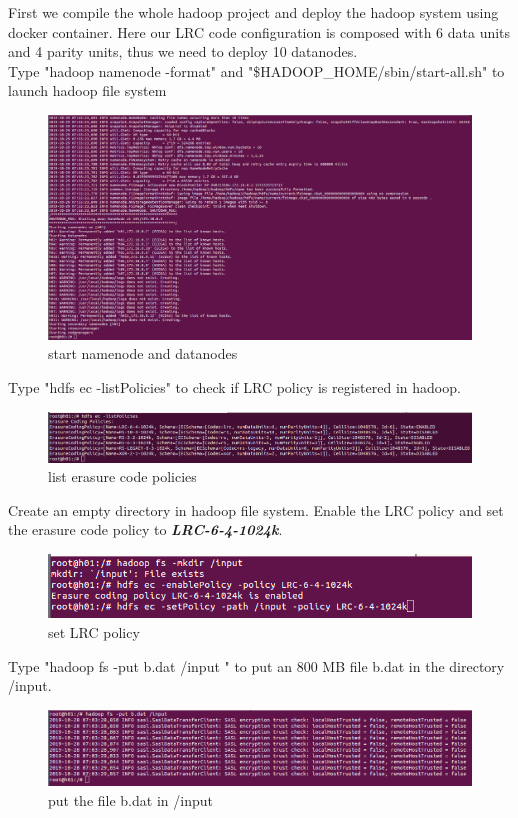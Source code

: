 \documentclass[10pt]{article}
\begin{document}
First we compile the whole hadoop project and deploy the hadoop system using docker container.
Here our LRC code configuration is composed with 6 data units and 4 parity units, thus we need to deploy 10 datanodes.\\

Type "hadoop namenode -format" and "\$HADOOP\_HOME/sbin/start-all.sh" to launch hadoop file system
\begin{figure}[H]
  \centering
  \includegraphics[width=\linewidth]{test-0.png}
  \caption{start namenode and datanodes}
\end{figure}

Type "hdfs ec -listPolicies" to check if LRC policy is registered in hadoop.
\begin{figure}[H]
  \centering
  \includegraphics[width=\linewidth]{test-1.png}
  \caption{list erasure code policies}
\end{figure}

Create an empty directory in hadoop file system. Enable the LRC policy and set the erasure code policy to \textbf{\textit{LRC-6-4-1024k}}.
\begin{figure}[H]
  \centering
  \includegraphics[width=\linewidth]{test-2.png}
  \caption{set LRC policy}
\end{figure}

Type "hadoop fs -put b.dat /input " to put an 800 MB file b.dat in the directory /input.
\begin{figure}[H]
  \centering
  \includegraphics[width=\linewidth]{test-3.png}
  \caption{put the file b.dat in /input}
\end{figure}
\end{document}
